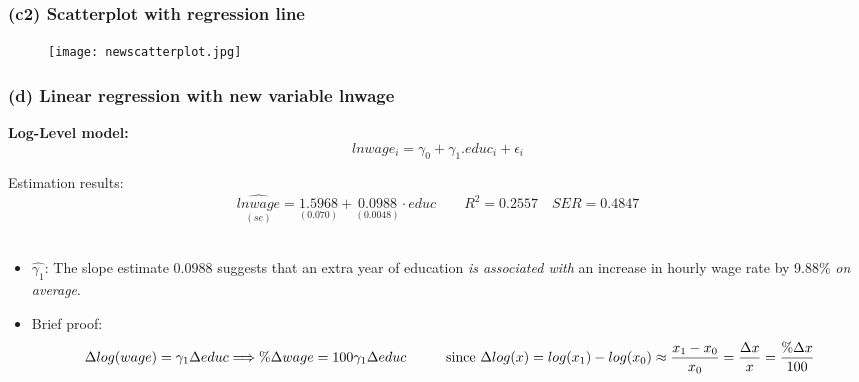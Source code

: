 \documentclass[11pt, xcolor=x11names,compress]{beamer}
\begin{document}
\begin{frame}[fragile,t]
\frametitle{(c2) Scatterplot with regression line}
\begin{figure}
    \centering
    \texttt{[image: newscatterplot.jpg]}
    \caption{}
    \label{fig:my_label}
\end{figure}
\end{frame}

\begin{frame}[fragile,t]
\frametitle{(d) Linear regression with new variable lnwage}\label{(d)}

\textbf{Log-Level model:}
$$
lnwage_i = \gamma_0 + \gamma_1.educ_i + \epsilon_i
$$

Estimation results:
$$\underset{(se)}{\widehat{lnwage}} = \underset{(0.070)}{1.5968} +  \underset{(0.0048)}{0.0988} \cdot educ \qquad R^2=0.2557 \quad SER= 0.4847$$ \\
\begin{itemize}
    \item $\hat{\gamma_1}$: The slope estimate 0.0988 suggests that an extra year of education \textit{is associated with} an increase in hourly wage rate by 9.88\% \textit{on average}.
    \item Brief proof:
    $$
    \Delta log(wage) = \gamma_1 \Delta educ \Longrightarrow \%\Delta wage = 100 \gamma_1 \Delta educ\\
    \hspace{10mm}\text{since } \Delta log(x) = log(x_1) - log(x_0) \approx \frac{x_1-x_0}{x_0} = \frac{\Delta x}{x} = \frac{\%\Delta x}{100}
    
    $$
\end{itemize}
\hyperlink{log-level}{}

\end{frame}
\end{document}
